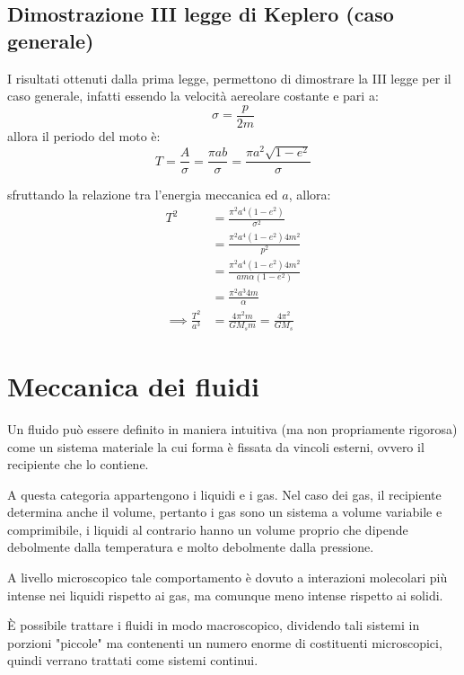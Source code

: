 \documentclass[11pt, a4paper, openright]{book}
\theoremstyle{plain}
\theoremstyle{definition}
\begin{document}
\section{Dimostrazione III legge di Keplero (caso generale)}
I risultati ottenuti dalla prima legge, permettono di dimostrare la III legge per il caso generale, infatti essendo la velocità aereolare costante e pari a:
\begin{equation}
    \sigma = \frac{p}{2m}
\end{equation}
allora il periodo del moto è:
\begin{equation}
    T = \frac{A}{\sigma} = \frac{\pi a b}{\sigma} = \frac{\pi a^2 \sqrt{1 - e^2}}{\sigma}
\end{equation}

sfruttando la relazione tra l'energia meccanica ed $a$, allora:
\begin{align}
    T^2 & = \frac{\pi^2a^4(1 - e^2)}{\sigma^2} \\
        & = \frac{\pi^2a^4(1 - e^2)4m^2}{p^2} \\
        & = \frac{\pi^2a^4(1 - e^2)4m^2}{am\alpha(1 - e^2)}  \\
        & = \frac{\pi^2a^3 4m}{\alpha} \\
    \implies \frac{T^2}{a^3} & = \frac{4\pi^2m}{GM_sm} = \frac{4\pi^2}{GM_s}
\end{align}




\chapter{Meccanica dei fluidi}
Un fluido può essere definito in maniera intuitiva (ma non propriamente rigorosa) come un sistema materiale la cui forma è fissata da vincoli esterni, ovvero il recipiente che lo contiene.

A questa categoria appartengono i liquidi e i gas. Nel caso dei gas, il recipiente determina anche il volume, pertanto i gas sono un sistema a volume variabile e comprimibile, i liquidi al contrario hanno un volume proprio che dipende debolmente dalla temperatura e molto debolmente dalla pressione.

A livello microscopico tale comportamento è dovuto a interazioni molecolari più intense nei liquidi rispetto ai gas, ma comunque meno intense rispetto ai solidi.

È possibile trattare i fluidi in modo macroscopico, dividendo tali sistemi in porzioni "piccole" ma contenenti un numero enorme di costituenti microscopici, quindi verrano trattati come sistemi continui.
\end{document}

